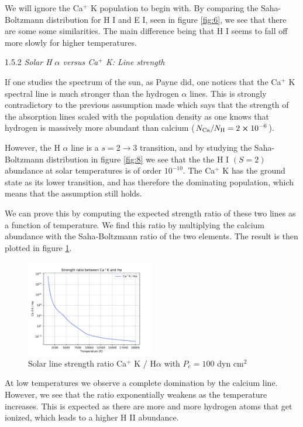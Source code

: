 \documentclass[a4paper,11.5pt,]{article}
\begin{document}
\begin{multicols}{2}
\noindent We will ignore the Ca$^+$ K population to begin with. By comparing the Saha-Boltzmann distribution for H I and E I, seen in figure \ref{fig:6}, we see that there are some some similarities. The main difference being that H I seems to fall off more slowly for higher temperatures.
\newpage
\begin{center}
1.5.2\textit{ Solar H $\alpha$ versus Ca$^+$ K: Line strength}
\end{center}
If one studies the spectrum of the sun, as Payne did, one notices that the Ca$^+$ K spectral line is much stronger than the hydrogen $\alpha$ lines. This is strongly contradictory to the previous assumption made which says that the strength of the absorption lines scaled with the population density as one knows that hydrogen is massively more abundant than calcium ($N_\text{Ca}/N_\text{H} = 2 \cross 10^{-6}$). 

However, the H $\alpha$ line is a $s = 2 \rightarrow 3$ transition, and by studying the Saha-Boltzmann distribution in figure \ref{fig:8} we see that the the H I $(S=2)$ abundance at solar temperatures is of order $10^{-10}$. The Ca$^+$ K has the ground state as its lower transition, and has therefore the dominating population, which means that the assumption still holds.

We can prove this by computing the expected strength ratio of these two lines as a function of temperature. We find this ratio by multiplying the calcium abundance with the Saha-Boltzmann ratio of the two elements. The result is then plotted in figure \ref{fig:9}. 

\begin{figure}[H]
	\centering
	\includegraphics[width=0.5\textwidth]{SSA/figures/strengthratio.pdf}
	\caption{Solar line strength ratio Ca$^+$ K / H$\alpha$ with $P_e = 100$ dyn cm$^2$ }
	\label{fig:9}
\end{figure}

\noindent At low temperatures we observe a complete domination by the calcium line. However, we see that the ratio exponentially weakens as the temperature increases. This is expected as there are more and more hydrogen atoms that get ionized, which leads to a higher H II abundance. 


\end{multicols}
\end{document}

